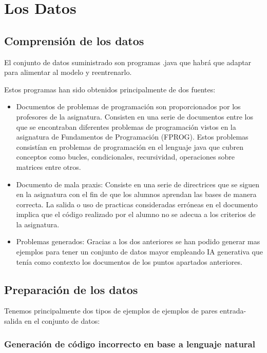 \chapter{Los Datos}

\section{Comprensión de los datos}
\label{cap:datos}

El conjunto de datos suministrado son programas .java que habrá que adaptar para alimentar al modelo y reentrenarlo.

Estos programas han sido obtenidos principalmente de dos fuentes:

\begin{itemize}
    \item Documentos de problemas de programación son proporcionados por los profesores de la asignatura. Consisten en una serie de documentos entre los que se encontraban diferentes problemas de programación vistos en la asignatura de Fundamentos de Programación (FPROG). Estos problemas consistían en problemas de programación en el lenguaje java que cubren conceptos como bucles, condicionales, recursividad, operaciones sobre matrices entre otros.
    
    \item Documento de mala praxis: Consiste en una serie de directrices que se siguen en la asignatura con el fin de que los alumnos aprendan las bases de manera correcta. La salida o uso de practicas consideradas erróneas en el documento implica que el código realizado por el alumno no se adecua a los criterios de la asignatura.

    \item Problemas generados: Gracias a los dos anteriores se han podido generar mas ejemplos para tener un conjunto de datos mayor empleando IA generativa que tenía como contexto los documentos de los puntos apartados anteriores.
\end{itemize}

\section{Preparación de los datos}

Tenemos principalmente dos tipos de ejemplos de ejemplos de pares entrada-salida en el conjunto de datos:

\subsection{Generación de código incorrecto en base a lenguaje natural}


